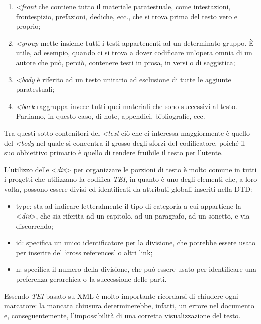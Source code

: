 \begin{enumerate}
\def\labelenumi{\arabic{enumi}.}
\item
  \emph{\textless{}front} che contiene tutto il materiale
  paratestuale, come intestazioni, frontespizio, prefazioni, dediche,
  ecc., che si trova prima del testo vero e proprio;
\item
  \emph{\textless{}group} mette insieme tutti i testi
  appartenenti ad un determinato gruppo. È utile, ad esempio, quando ci
  si trova a dover codificare un'opera omnia di un autore che può,
  perciò, contenere testi in prosa, in versi o di saggistica;
\item
  \emph{\textless{}body} è riferito ad un testo unitario
  ad esclusione di tutte le aggiunte paratestuali;
\item
  \emph{\textless{}back} raggruppa invece tutti quei
  materiali che sono successivi al testo. Parliamo, in questo caso, di
  note, appendici, bibliografie, ecc.
\end{enumerate}

Tra questi sotto contenitori del \emph{\textless{}text}
ciò che ci interessa maggiormente è quello del
\emph{\textless{}body} nel quale si concentra il grosso
degli sforzi del codificatore, poiché il suo obbiettivo primario è
quello di rendere fruibile il testo per l'utente.

L'utilizzo delle \textless{}\emph{div}\textgreater{} per organizzare le
porzioni di testo è molto comune in tutti i progetti che utilizzano la
codifica \emph{TEI}, in quanto è uno degli elementi che, a loro volta,
possono essere divisi ed identificati da attributi globali inseriti
nella DTD:

\begin{itemize}
\item
  type: sta ad indicare letteralmente il tipo di categoria a cui
  appartiene la \textless{}\emph{div}\textgreater{}, che sia riferita ad
  un capitolo, ad un paragrafo, ad un sonetto, e via discorrendo;
\item
  id: specifica un unico identificatore per la divisione, che potrebbe
  essere usato per inserire del `cross references' o altri link;
\item
  n: specifica il numero della divisione, che può essere usato per
  identificare una preferenza gerarchica o la successione delle parti.
\end{itemize}

Essendo \emph{TEI} basato su XML è molto importante ricordarsi di
chiudere ogni marcatore: la mancata chiusura determinerebbe, infatti, un
errore nel documento e, conseguentemente, l'impossibilità di una
corretta visualizzazione del testo.

